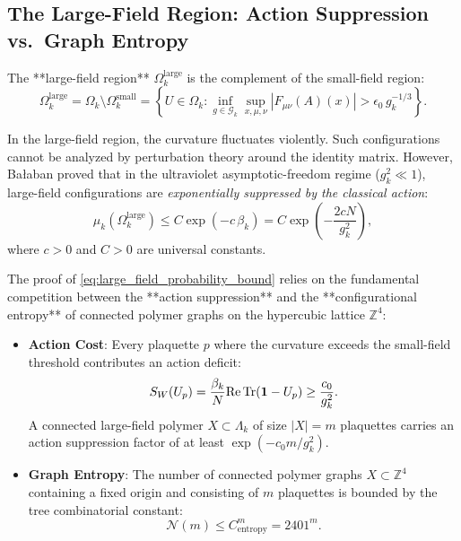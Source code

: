 \subsection{The Large-Field Region: Action Suppression vs.\ Graph Entropy}
\label{subsec:large_field_entropy}

\begin{definition}
\label{def:large_field_region}
The **large-field region** $\Omega_k^{\mathrm{large}}$ is the complement of the small-field region:
\begin{equation}
\label{eq:ch12_large_field_def}
\Omega_k^{\mathrm{large}} = \Omega_k \setminus \Omega_k^{\mathrm{small}} = \left\{ U \in \Omega_k : \inf_{g \in \mathcal{G}_k} \sup_{x, \mu, \nu} |F_{\mu\nu}(A)(x)| > \epsilon_0 \, g_k^{-1/3} \right\}.
\end{equation}
\end{definition}

In the large-field region, the curvature fluctuates violently. Such configurations cannot be analyzed by perturbation theory around the identity matrix. However, Ba\l aban proved that in the ultraviolet asymptotic-freedom regime ($g_k^2 \ll 1$), large-field configurations are \emph{exponentially suppressed by the classical action}:
\begin{equation}
\label{eq:large_field_probability_bound}
\mu_k\left( \Omega_k^{\mathrm{large}} \right) \le C \exp\left( -c \, \beta_k \right) = C \exp\left( -\frac{2c N}{g_k^2} \right),
\end{equation}
where $c > 0$ and $C > 0$ are universal constants.

The proof of \eqref{eq:large_field_probability_bound} relies on the fundamental competition between the **action suppression** and the **configurational entropy** of connected polymer graphs on the hypercubic lattice $\mathbb{Z}^4$:
\begin{itemize}
    \item \textbf{Action Cost}: Every plaquette $p$ where the curvature exceeds the small-field threshold contributes an action deficit:
    \begin{equation}
    S_W(U_p) = \frac{\beta_k}{N} \mathrm{Re} \, \mathrm{Tr}(\mathbf{1} - U_p) \ge \frac{c_0}{g_k^2}.
    \end{equation}
    A connected large-field polymer $X \subset \Lambda_k$ of size $|X| = m$ plaquettes carries an action suppression factor of at least $\exp(-c_0 m / g_k^2)$.
    \item \textbf{Graph Entropy}: The number of connected polymer graphs $X \subset \mathbb{Z}^4$ containing a fixed origin and consisting of $m$ plaquettes is bounded by the tree combinatorial constant:
    \begin{equation}
    \mathcal{N}(m) \le C_{\mathrm{entropy}}^m = 2401^m.
    \end{equation}
\end{itemize}


